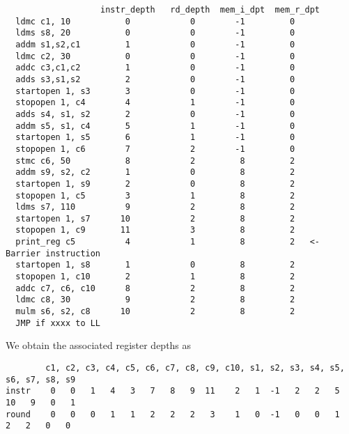 \begin{verbatim}
                   instr_depth   rd_depth  mem_i_dpt  mem_r_dpt
  ldmc c1, 10           0            0        -1         0
  ldms s8, 20           0            0        -1         0
  addm s1,s2,c1         1            0        -1         0
  ldmc c2, 30           0            0        -1         0
  addc c3,c1,c2         1            0        -1         0
  adds s3,s1,s2         2            0        -1         0
  startopen 1, s3       3            0        -1         0
  stopopen 1, c4        4            1        -1         0
  adds s4, s1, s2       2            0        -1         0
  addm s5, s1, c4       5            1        -1         0
  startopen 1, s5       6            1        -1         0
  stopopen 1, c6        7            2        -1         0
  stmc c6, 50           8            2         8         2
  addm s9, s2, c2       1            0         8         2
  startopen 1, s9       2            0         8         2
  stopopen 1, c5        3            1         8         2
  ldms s7, 110          9            2         8         2
  startopen 1, s7      10            2         8         2
  stopopen 1, c9       11            3         8         2
  print_reg c5          4            1         8         2   <- Barrier instruction
  startopen 1, s8       1            0         8         2
  stopopen 1, c10       2            1         8         2
  addc c7, c6, c10      8            2         8         2
  ldmc c8, 30           9            2         8         2
  mulm s6, s2, c8      10            2         8         2
  JMP if xxxx to LL
\end{verbatim}
We obtain the associated register depths as
\begin{verbatim}
        c1, c2, c3, c4, c5, c6, c7, c8, c9, c10, s1, s2, s3, s4, s5, s6, s7, s8, s9
instr    0   0   1   4   3   7   8   9  11    2   1  -1   2   2   5  10   9   0   1
round    0   0   0   1   1   2   2   2   3    1   0  -1   0   0   1   2   2   0   0
\end{verbatim}

